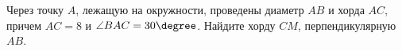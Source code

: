 \begin{ex}
	\begin{condition}
		Через точку \( A \), лежащую на окружности, проведены диаметр \( AB  \) и хорда \( AC \), причем \( AC = 8  \) и  \( \angle BAC = 30\degree\). Найдите хорду \( CM  \), перпендикулярную \( AB \).
	\end{condition}
\end{ex}